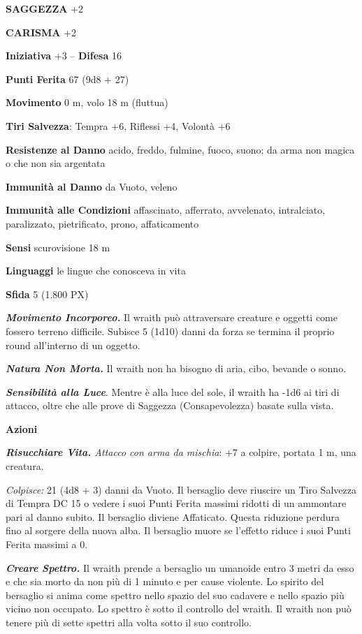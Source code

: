 \begin{multicols}{2}
	\textbf{SAGGEZZA} +2

	\textbf{CARISMA} +2

	\textbf{Iniziativa} +3 -- \textbf{Difesa} 16

	\textbf{Punti Ferita} 67 (9d8 + 27)

	\textbf{Movimento} 0 m, volo 18 m (fluttua)

	\textbf{Tiri Salvezza}: Tempra +6, Riflessi +4, Volontà +6

	\textbf{Resistenze al Danno} acido, freddo, fulmine, fuoco, suono; da arma non magica o che non sia argentata

	\textbf{Immunità al Danno} da Vuoto, veleno

	\textbf{Immunità alle Condizioni} affascinato, afferrato, avvelenato, intralciato, paralizzato, pietrificato, prono, affaticamento

	\textbf{Sensi} scurovisione 18 m

	\textbf{Linguaggi} le lingue che conosceva in vita

	\textbf{Sfida} 5 (1.800 PX)

	\textit{\textbf{Movimento Incorporeo.}} Il wraith può attraversare creature e oggetti come fossero terreno difficile. Subisce 5 (1d10) danni da forza se termina il proprio round all'interno di un oggetto.

	\textit{\textbf{Natura Non Morta.}} Il wraith non ha bisogno di aria, cibo, bevande o sonno.

	\textit{\textbf{Sensibilità alla Luce}}. Mentre è alla luce del sole, il wraith ha -1d6 ai tiri di attacco, oltre che alle prove di Saggezza (Consapevolezza) basate sulla vista.

	\textbf{Azioni}

	\textit{\textbf{Risucchiare Vita.} Attacco con arma da mischia}: +7 a colpire, portata 1 m, una creatura.

	\textit{Colpisce:} 21 (4d8 + 3) danni da Vuoto. Il bersaglio deve riuscire un Tiro Salvezza di Tempra DC 15 o vedere i suoi Punti Ferita massimi ridotti di un ammontare pari al danno subito. Il bersaglio diviene Affaticato. Questa riduzione perdura fino al sorgere della nuova alba. Il bersaglio muore se l'effetto riduce i suoi Punti Ferita massimi a 0.

	\textit{\textbf{Creare Spettro.}} Il wraith prende a bersaglio un umanoide entro 3 metri da esso e che sia morto da non più di 1 minuto e per cause violente. Lo spirito del bersaglio si anima come spettro nello spazio del suo cadavere e nello spazio più vicino non occupato. Lo spettro è sotto il controllo del wraith. Il wraith non può tenere più di sette spettri alla volta sotto il suo controllo.


\end{multicols}
